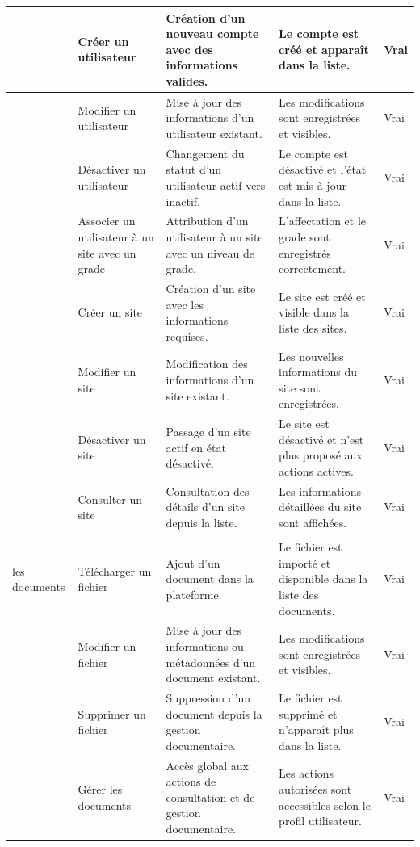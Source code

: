 \begin{longtable}{|>{\centering\arraybackslash}m{3.1cm}|
>{\raggedright\arraybackslash}p{2.9cm}|
>{\raggedright\arraybackslash}p{4.4cm}|
>{\raggedright\arraybackslash}p{5.0cm}|
>{\centering\arraybackslash}p{1.3cm}|}
 &
Créer un utilisateur &
Création d'un nouveau compte avec des informations valides. &
Le compte est créé et apparaît dans la liste. &
Vrai \\
\cline{2-5}

 &
Modifier un utilisateur &
Mise à jour des informations d'un utilisateur existant. &
Les modifications sont enregistrées et visibles. &
Vrai \\
\cline{2-5}

 &
Désactiver un utilisateur &
Changement du statut d'un utilisateur actif vers inactif. &
Le compte est désactivé et l'état est mis à jour dans la liste. &
Vrai \\
\cline{2-5}

 &
Associer un utilisateur à un site avec un grade &
Attribution d'un utilisateur à un site avec un niveau de grade. &
L'affectation et le grade sont enregistrés correctement. &
Vrai \\
\hline

\multirow{4}{=}{\centering Gérer les sites} &
Créer un site &
Création d'un site avec les informations requises. &
Le site est créé et visible dans la liste des sites. &
Vrai \\
\cline{2-5}

 &
Modifier un site &
Modification des informations d'un site existant. &
Les nouvelles informations du site sont enregistrées. &
Vrai \\
\cline{2-5}

 &
Désactiver un site &
Passage d'un site actif en état désactivé. &
Le site est désactivé et n'est plus proposé aux actions actives. &
Vrai \\
\cline{2-5}

 &
Consulter un site &
Consultation des détails d'un site depuis la liste. &
Les informations détaillées du site sont affichées. &
Vrai \\
\hline

\multirow{4}{=}{\centering Gérer \\les documents} &
Télécharger un fichier &
Ajout d'un document dans la plateforme. &
Le fichier est importé et disponible dans la liste des documents. &
Vrai \\
\cline{2-5}

 &
Modifier un fichier &
Mise à jour des informations ou métadonnées d'un document existant. &
Les modifications sont enregistrées et visibles. &
Vrai \\
\cline{2-5}

 &
Supprimer un fichier &
Suppression d'un document depuis la gestion documentaire. &
Le fichier est supprimé et n'apparaît plus dans la liste. &
Vrai \\
\cline{2-5}

 &
Gérer les documents &
Accès global aux actions de consultation et de gestion documentaire. &
Les actions autorisées sont accessibles selon le profil utilisateur. &
Vrai \\
\hline

\end{longtable}
\normalsize
